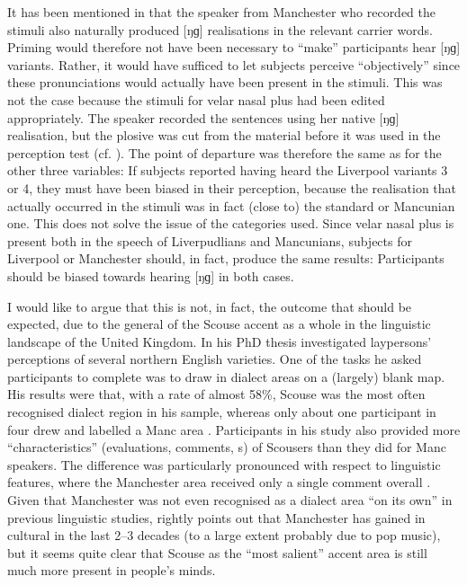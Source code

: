 It has been mentioned in  that the speaker from Manchester who recorded the stimuli also naturally produced [ŋɡ] realisations in the relevant carrier words.
Priming would therefore not have been necessary to ``make'' participants hear [ŋɡ] variants.
Rather, it would have sufficed to let subjects perceive ``objectively'' since these pronunciations would actually have been present in the stimuli.
This was not the case because the stimuli for velar nasal plus had been edited appropriately.
The speaker recorded the sentences using her native [ŋɡ] realisation, but the plosive was cut from the material before it was used in the perception test (cf. ).
The point of departure was therefore the same as for the other three variables: If subjects reported having heard the Liverpool variants 3 or 4, they must have been biased in their perception, because the realisation that actually occurred in the stimuli was in fact (close to) the standard or Mancunian one.
This does not solve the issue of the  categories used.
Since velar nasal plus is present both in the speech of Liverpudlians and Mancunians,  subjects for Liverpool or Manchester should, in fact, produce the same results: Participants should be biased towards hearing [ŋɡ] in both cases.

I would like to argue that this is not, in fact, the outcome that should be expected, due to the general  of the Scouse accent as a whole in the linguistic landscape of the United Kingdom.
In his \citeyear{montgomery2007} PhD thesis \citeauthor{montgomery2007} investigated laypersons' perceptions of several northern English varieties.
One of the tasks he asked participants to complete was to draw in dialect areas on a (largely) blank map.
His results were that, with a rate of almost 58\%, Scouse was the most often recognised dialect region in his sample, whereas only about one participant in four drew and labelled a Manc area \parencite[cf.][194]{montgomery2007}.
Participants in his study also provided more ``characteristics'' (evaluations, comments, s) of Scousers than they did for Manc speakers.
The difference was particularly pronounced with respect to linguistic features, where the Manchester area received only a single comment overall \parencite[cf.][246--252]{montgomery2007}.
Given that Manchester was not even recognised as a dialect area ``on its own'' in previous linguistic studies, \textcite[cf.][214--215]{montgomery2007} rightly points out that Manchester has gained in cultural  in the last 2--3 decades (to a large extent probably due to pop music), but it seems quite clear that Scouse as the ``most salient'' \parencite[216]{montgomery2007} accent area is still much more present in people's minds.

